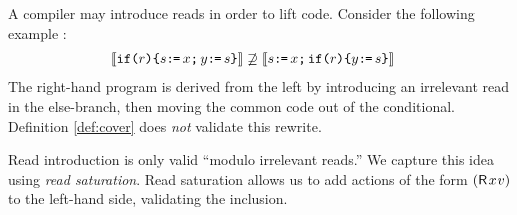 













A compiler may introduce reads in order to lift code.  Consider the
following example \cite[.5]{SevcikThesis}:
\begin{align*}
  \llbracket\texttt{if}\allowbreak\texttt{(}r\texttt{)} \allowbreak\texttt{\{} s \texttt{:}\mkern-1mu\texttt{=}\, x \texttt{;}\,\allowbreak y \texttt{:}\mkern-1mu\texttt{=}\, s \texttt{\}}\rrbracket
  &\not\supseteq
  \llbracket s \texttt{:}\mkern-1mu\texttt{=}\, x \texttt{;}\,\allowbreak \texttt{if}\allowbreak\texttt{(}r\texttt{)} \allowbreak\texttt{\{} y \texttt{:}\mkern-1mu\texttt{=}\, s \texttt{\}}\rrbracket
\end{align*}
The right-hand program is derived from the left by introducing an irrelevant
read in the else-branch, then moving the common code out of the
conditional.  Definition \ref{def:cover} does \emph{not} validate this rewrite.

Read introduction is only valid ``modulo irrelevant reads.'' We capture this
idea using \emph{read saturation}.  Read saturation allows us to add actions
of the form $(\DR{x}{v})$ to the left-hand side, validating the inclusion.


